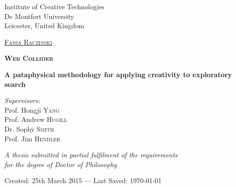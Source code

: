 
\begin{titlepage}
\begin{center}

Institute of Creative Technologies\\
De Montfort University\\
Leicester, United Kingdom

\vspace{2cm}

\textsc{\huge \href{http://fania.uk}{Fania Raczinski}}

\vspace{2cm}


\textsc{\Huge \bfseries Web Collider}

\vspace{1.5cm}

{\huge \bfseries A pataphysical methodology for applying creativity to exploratory search}

\vspace{2cm}

\emph{Supervisors:}\\
{Prof. Hongji \textsc{Yang}}\\
{Prof. Andrew \textsc{Hugill}}\\
{Dr. Sophy \textsc{Smith}}\\
{Prof. Jim \textsc{Hendler}}

\vspace{1.5cm}

\large \textit{A thesis submitted in partial fulfilment of the requirements\\ for the degree of Doctor of Philosophy}

\vfill

Created: {25th March 2015} --- Last Saved: {\today}\\

\end{center}
\end{titlepage}
